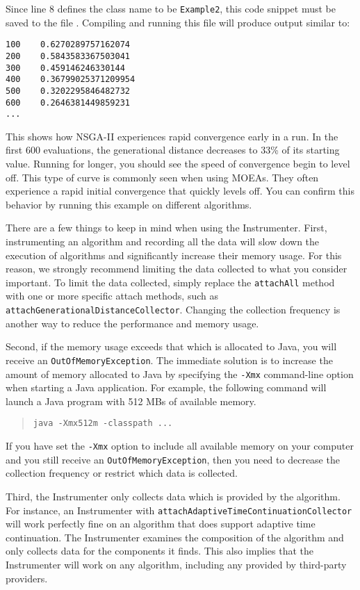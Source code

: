 Since line 8 defines the class name to be \texttt{Example2}, this code snippet must be saved to the file .  Compiling and running this file will produce output similar to:

\begin{lstlisting}[language=Plaintext]
100    0.6270289757162074
200    0.5843583367503041
300    0.459146246330144
400    0.36799025371209954
500    0.3202295846482732
600    0.2646381449859231
...
\end{lstlisting}

This shows how NSGA-II experiences rapid convergence early in a run.  In the first 600 evaluations, the generational distance decreases to 33\% of its starting value.  Running for longer, you should see the speed of convergence begin to level off.  This type of curve is commonly seen when using MOEAs.  They often experience a rapid initial convergence that quickly levels off.  You can confirm this behavior by running this example on different algorithms.

There are a few things to keep in mind when using the Instrumenter. First, instrumenting an algorithm and recording all the data will slow down the execution of algorithms and significantly increase their memory usage.  For this reason, we strongly recommend limiting the data collected to what you consider important.  To limit the data collected, simply replace the \texttt{attachAll} method with one or more specific attach methods, such as \texttt{attachGenerationalDistanceCollector}.  Changing the collection frequency is another way to reduce the performance and memory usage.

Second, if the memory usage exceeds that which is allocated to Java, you will receive an \texttt{OutOfMemoryException}.  The immediate solution is to increase the amount of memory allocated to Java by specifying the \texttt{-Xmx} command-line option when starting a Java application.  For example, the following command will launch a Java program with 512 MBs of available memory.

\begin{quote}
  \texttt{java -Xmx512m -classpath ...}
\end{quote}

If you have set the \texttt{-Xmx} option to include all available memory on your computer and you still receive an \texttt{OutOfMemoryException}, then you need to decrease the collection frequency or restrict which data is collected.

Third, the Instrumenter only collects data which is provided by the algorithm.  For instance, an Instrumenter with \texttt{attachAdaptiveTimeContinuationCollector} will work perfectly fine on an algorithm that does support adaptive time continuation.  The Instrumenter examines the composition of the algorithm and only collects data for the components it finds.  This also implies that the Instrumenter will work on any algorithm, including any provided by third-party providers.

